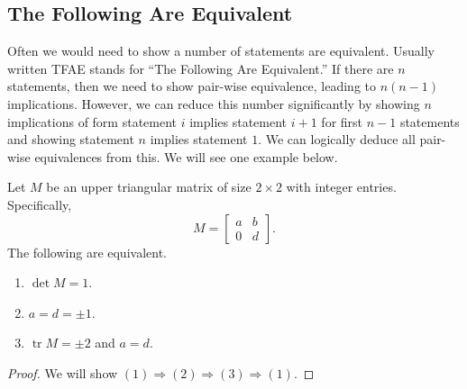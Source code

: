 \documentclass[a4paper,english,12pt]{article}
\begin{document}
\subsection{The Following Are Equivalent}
Often we would need to show a number of statements are equivalent. Usually written TFAE stands for ``The Following Are Equivalent.'' If there are $n$ statements, then we need to show pair-wise equivalence, leading to $n(n-1)$ implications. However, we can reduce this number significantly by showing $n$ implications of form statement $i$ implies statement $i+1$ for first $n-1$ statements and showing statement $n$ implies statement $1$. We can logically deduce all pair-wise equivalences from this. We will see one example below.
\begin{thm} Let $M$ be an upper triangular matrix of size $2 \times 2$ with integer entries. Specifically, 
\begin{equation*}
M = \left[\begin{array}{cc}a & b\\0&d\end{array}\right].
\end{equation*}
The following are equivalent.
\begin{enumerate}
\item $\det M = 1$.
\item $a = d = \pm 1$.
\item $\operatorname{tr} M = \pm 2$ and $a=d$.
\end{enumerate}
\end{thm}
\begin{proof} We will show $(1) \Rightarrow (2) \Rightarrow (3) \Rightarrow (1)$.
\end{proof}
\end{document}
